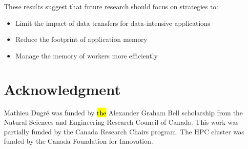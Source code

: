 \documentclass[AMA,STIX1COL]{WileyNJD-v2}
\newcommand{\HL}[1]{\hl{#1}}
\begin{document}
These results suggest that future research should focus on strategies to:
\begin{itemize}
	\item Limit the impact of data transfers for data-intensive applications
	\item Reduce the footprint of application memory
	\item Manage the memory of workers more efficiently
\end{itemize}
											
\section*{Acknowledgment}
Mathieu Dugr\'e was funded by \HL{the} Alexander Graham Bell scholarship from
the Natural Sciences and Engineering Research Council of Canada. This work
was partially funded by the Canada Research Chairs program. The HPC cluster
was funded by the Canada Foundation for Innovation.
											


\end{document}
